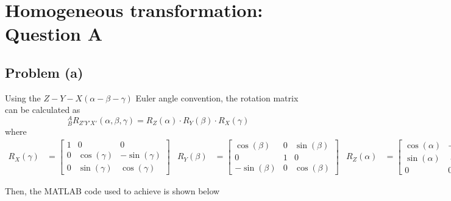 \documentclass[main.tex]{subfiles}
\begin{document}
\section{Homogeneous transformation: Question A}

\subsection{Problem (a)}

Using the $Z-Y-X (\alpha - \beta - \gamma)$ Euler angle convention, the rotation matrix can be calculated as \cite{ craig2005introduction}
\begin{equation}
^A_BR_{Z'Y'X'}(\alpha, \beta, \gamma) = R_Z(\alpha) \cdot R_Y(\beta) \cdot R_X(\gamma)
\label{euler2rot}
\end{equation}
where
\begin{align}
    R_X(\gamma) &=
    \begin{bmatrix}
        1 & 0 & 0 \\
        0 & \cos(\gamma) & -\sin(\gamma) \\
        0 & \sin(\gamma) & \cos(\gamma)
    \end{bmatrix} &
    R_Y(\beta) &=
    \begin{bmatrix}
        \cos(\beta) & 0 & \sin(\beta) \\
        0 & 1 & 0 \\
        -\sin(\beta) & 0 & \cos(\beta)
    \end{bmatrix} &
    R_Z(\alpha) &=
    \begin{bmatrix}
        \cos(\alpha) & -\sin(\alpha) & 0 \\
        \sin(\alpha) & \cos(\alpha) & 0 \\
        0 & 0 & 1
    \end{bmatrix}
\end{align}

Then, the MATLAB code used to achieve is shown below
\lstset{language=MATLAB}

\end{document}
